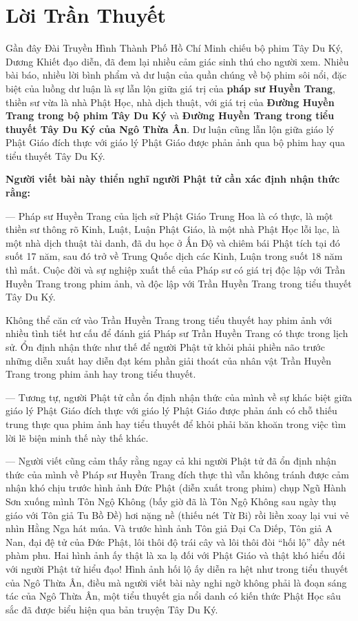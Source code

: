 \chapter{Lời Trần Thuyết} %
\label{cha:loi_tran_thuyet}

Gần đây Đài Truyền Hình Thành Phố Hồ Chí Minh chiếu bộ phim Tây Du Ký, Dương Khiết đạo diễn, đã đem lại nhiều cảm giác sinh thú cho người xem. Nhiều bài báo, nhiều lời bình phẩm và dư luận của quần chúng về bộ phim sôi nổi, đặc biệt của luồng dư luận là sự lẫn lộn giữa giá trị của {\bf pháp sư Huyền Trang}, thiền sư vừa là nhà Phật Học, nhà dịch thuật, với giá trị của {\bf Đường Huyền Trang trong bộ phim Tây Du Ký} và {\bf Đường Huyền Trang trong tiểu thuyết Tây Du Ký của Ngô Thừa Ân}. Dư luận cũng lẫn lộn giữa giáo lý Phật Giáo đích thực với giáo lý Phật Giáo được phản ảnh qua bộ phim hay qua tiểu thuyết Tây Du Ký.

{\bf Người viết bài này thiển nghĩ người Phật tử cần xác định nhận thức rằng:}

— Pháp sư Huyền Trang của lịch sử Phật Giáo Trung Hoa là có thực, là một thiền sư thông rõ Kinh, Luật, Luận Phật Giáo, là một nhà Phật Học lỗi lạc, là một nhà dịch thuật tài danh, đã du học ở Ấn Độ và chiêm bái Phật tích tại đó suốt 17 năm, sau đó trở về Trung Quốc dịch các Kinh, Luận trong suốt 18 năm thì mất. Cuộc đời và sự nghiệp xuất thế của Pháp sư có giá trị độc lập với Trần Huyền Trang trong phim ảnh, và độc lập với Trần Huyền Trang trong tiểu thuyết Tây Du Ký.

Không thể căn cứ vào Trần Huyền Trang trong tiểu thuyết hay phim ảnh với nhiều tình tiết hư cấu để đánh giá Pháp sư Trần Huyền Trang có thực trong lịch sử. Ổn định nhận thức như thế để người Phật tử khỏi phải phiền não trước những diễn xuất hay diễn đạt kém phần giải thoát của nhân vật Trần Huyền Trang trong phim ảnh hay trong tiểu thuyết.

— Tương tự, người Phật tử cần ổn định nhận thức của mình về sự khác biệt giữa giáo lý Phật Giáo đích thực với giáo lý Phật Giáo được phản ánh có chỗ thiếu trung thực qua phim ảnh hay tiểu thuyết để khỏi phải băn khoăn trong việc tìm lời lẽ biện minh thế này thế khác.

— Người viết cũng cảm thấy rằng ngay cả khi người Phật tử đã ổn định nhận thức của mình về Pháp sư Huyền Trang đích thực thì vẫn không tránh được cảm nhận khó chịu trước hình ảnh Đức Phật (diễn xuất trong phim) chụp Ngũ Hành Sơn xuống mình Tôn Ngộ Không (bấy giờ đã là Tôn Ngộ Không sau ngày thụ giáo với Tôn giả Tu Bồ Đề) hơi nặng nề (thiếu nét Từ Bi) rồi liền xoay lại vui vẻ nhìn Hằng Nga hát múa. Và trước hình ảnh Tôn giả Đại Ca Diếp, Tôn giả A Nan, đại đệ tử của Đức Phật, lôi thôi độ trái cây và lôi thôi đòi ``hối lộ'' đầy nét phàm phu. Hai hình ảnh ấy thật là xa lạ đối với Phật Giáo và thật khó hiểu đối với người Phật tử hiểu đạo! Hình ảnh hối lộ ấy diễn ra hệt như trong tiểu thuyết của Ngô Thừa Ân, điều mà người viết bài này nghi ngờ không phải là đoạn sáng tác của Ngô Thừa Ân, một tiểu thuyết gia nổi danh có kiến thức Phật Học sâu sắc đã được biểu hiện qua bản truyện Tây Du Ký.

